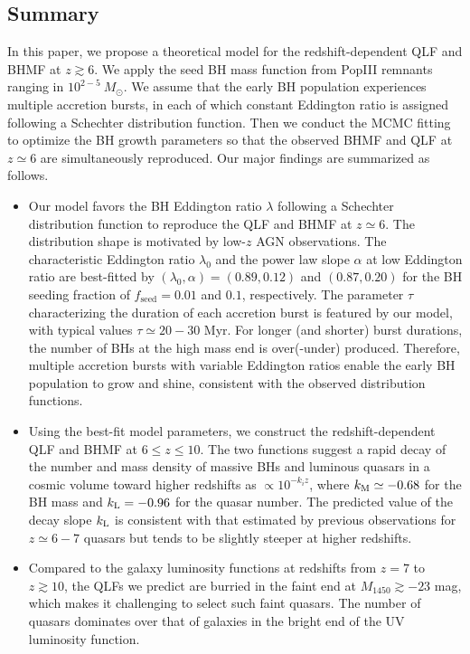 \documentclass[twocolumn, twocolappendix]{aastex63}
\newcommand{\Msun}{M_\odot}
\newcommand{\fseed}{f_\mathrm{seed}}
\newcommand{\Muv}{M_{1450}}
\begin{document}
\begin{CJK*}{UTF8}{gbsn}
\section{Summary}
In this paper, we propose a theoretical model for the redshift-dependent QLF and BHMF at $z\gtrsim 6$.
We apply the seed BH mass function from PopIII remnants ranging in $10^{2-5}~\Msun$.
We assume that the early BH population experiences multiple accretion bursts, in each of which constant Eddington ratio
is assigned following a Schechter distribution function.
Then we conduct the MCMC fitting to optimize the BH growth parameters
so that the observed BHMF and QLF at $z\simeq 6$ are simultaneously reproduced. Our major findings are summarized as follows.
\begin{itemize}
\item
Our model favors the BH Eddington ratio $\lambda$ following a Schechter distribution function to reproduce the QLF and BHMF at $z\simeq 6$.
The distribution shape is motivated by low-$z$ AGN observations.
The characteristic Eddington ratio $\lambda_0$ and the power law slope $\alpha$ at low Eddington ratio are best-fitted by
$(\lambda_0, \alpha)=(0.89,0.12)$ and $(0.87,0.20)$ for the BH seeding fraction of $\fseed = 0.01$ and $0.1$, respectively.
The parameter $\tau$ characterizing the duration of each accretion burst is featured by our model,
with typical values $\tau \simeq 20-30$ Myr.
For longer (and shorter) burst durations, the number of BHs at the high mass end is over(-under) produced.
Therefore, multiple accretion bursts with variable Eddington ratios enable the early BH population to grow and shine,
consistent with the observed distribution functions.
\item
Using the best-fit model parameters, we construct the redshift-dependent QLF and BHMF at $6\leq z \leq 10$.
The two functions suggest a rapid decay of the number and mass density of massive BHs and luminous quasars in a cosmic volume
toward higher redshifts as $\propto 10^{-k_i z}$, where $k_{\rm M}\simeq -0.68$ for the BH mass and $k_{\rm L}=-0.96$ for the quasar number.
The predicted value of the decay slope $k_{\rm L}$ is consistent with that estimated by previous observations for $z\simeq 6-7$ quasars
but tends to be slightly steeper at higher redshifts.
\item
Compared to the galaxy luminosity functions at redshifts from $z=7$ to $z\gtrsim 10$, the QLFs we predict are burried in the faint end at $\Muv \gtrsim -23$ mag,
which makes it challenging to select such faint quasars.
The number of quasars dominates over that of galaxies in the bright end of the UV luminosity function.

\end{itemize}
\end{CJK*}
\end{document}
